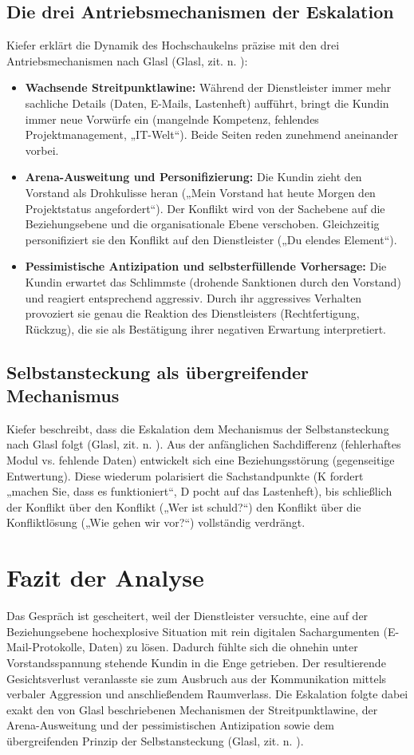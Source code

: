 \subsection{Die drei Antriebsmechanismen der Eskalation}
Kiefer erklärt die Dynamik des Hochschaukelns präzise mit den drei Antriebsmechanismen nach Glasl (Glasl, zit. n. \cite[S.~30--33]{5}):
\begin{itemize}
    \item \textbf{Wachsende Streitpunktlawine:} Während der Dienstleister immer mehr sachliche Details (Daten, E-Mails, Lastenheft) aufführt, bringt die Kundin immer neue Vorwürfe ein (mangelnde Kompetenz, fehlendes Projektmanagement, „IT-Welt“). Beide Seiten reden zunehmend aneinander vorbei.
    \item \textbf{Arena-Ausweitung und Personifizierung:} Die Kundin zieht den Vorstand als Drohkulisse heran („Mein Vorstand hat heute Morgen den Projektstatus angefordert“). Der Konflikt wird von der Sachebene auf die Beziehungsebene und die organisationale Ebene verschoben. Gleichzeitig personifiziert sie den Konflikt auf den Dienstleister („Du elendes Element“).
    \item \textbf{Pessimistische Antizipation und selbsterfüllende Vorhersage:} Die Kundin erwartet das Schlimmste (drohende Sanktionen durch den Vorstand) und reagiert entsprechend aggressiv. Durch ihr aggressives Verhalten provoziert sie genau die Reaktion des Dienstleisters (Rechtfertigung, Rückzug), die sie als Bestätigung ihrer negativen Erwartung interpretiert.
\end{itemize}

\subsection{Selbstansteckung als übergreifender Mechanismus}
Kiefer beschreibt, dass die Eskalation dem Mechanismus der Selbstansteckung nach Glasl folgt (Glasl, zit. n. \cite[S.~42--43]{5}). Aus der anfänglichen Sachdifferenz (fehlerhaftes Modul vs. fehlende Daten) entwickelt sich eine Beziehungsstörung (gegenseitige Entwertung). Diese wiederum polarisiert die Sachstandpunkte (K fordert „machen Sie, dass es funktioniert“, D pocht auf das Lastenheft), bis schließlich der Konflikt über den Konflikt („Wer ist schuld?“) den Konflikt über die Konfliktlösung („Wie gehen wir vor?“) vollständig verdrängt.

\section{Fazit der Analyse}
Das Gespräch ist gescheitert, weil der Dienstleister versuchte, eine auf der Beziehungsebene hochexplosive Situation mit rein digitalen Sachargumenten (E-Mail-Protokolle, Daten) zu lösen. Dadurch fühlte sich die ohnehin unter Vorstandsspannung stehende Kundin in die Enge getrieben. Der resultierende Gesichtsverlust veranlasste sie zum Ausbruch aus der Kommunikation mittels verbaler Aggression und anschließendem Raumverlass. Die Eskalation folgte dabei exakt den von Glasl beschriebenen Mechanismen der Streitpunktlawine, der Arena-Ausweitung und der pessimistischen Antizipation sowie dem übergreifenden Prinzip der Selbstansteckung (Glasl, zit. n. \cite[S.~30--33]{5}).

